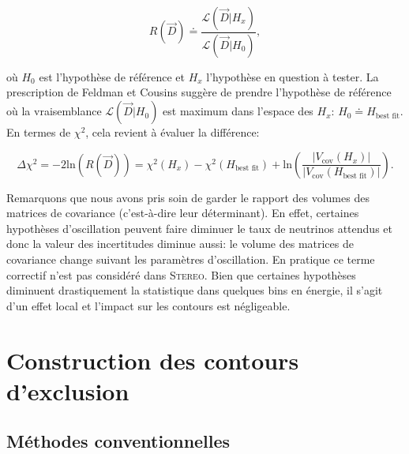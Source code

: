 \begin{equation}
    R(\overrightarrow{D} ) \doteq \frac{\mathcal{L}(\overrightarrow{D} | H_x)}{\mathcal{L}(\overrightarrow{D} | H_0)},
\end{equation}


\bigbreak

où $H_0$ est l'hypothèse de référence et $H_x$ l'hypothèse en question à tester. La prescription de Feldman et Cousins \cite{Feldman:1998wt} suggère de prendre l'hypothèse de référence où la vraisemblance $\mathcal{L}(\overrightarrow{D} | H_0)$ est maximum dans l'espace des $H_x$: $H_0 \doteq H_\textrm{best fit}$. En termes de $\chi^2$, cela revient à évaluer la différence:

\begin{equation}
    \Delta \chi^2 = -2\textrm{ln}\left(R(\overrightarrow{D})\right) = \chi^2(H_x) - \chi^2(H_\textrm{best fit}) + \textrm{ln}\left( \frac{\left| V_\textrm{cov}(H_x) \right|}{\left| V_\textrm{cov}(H_\textrm{best fit} ) \right|} \right).
\end{equation}

\bigbreak

Remarquons que nous avons pris soin de garder le rapport des volumes des matrices de covariance (c'est-à-dire leur déterminant). En effet, certaines hypothèses d'oscillation peuvent faire diminuer le taux de neutrinos attendus et donc la valeur des incertitudes diminue aussi: le volume des matrices de covariance change suivant les paramètres d'oscillation. En pratique ce terme correctif n'est pas considéré dans \textsc{Stereo}. Bien que certaines hypothèses diminuent drastiquement la statistique dans quelques bins en énergie, il s'agit d'un effet local et l'impact sur les contours est négligeable.\\


\bigbreak

\section{Construction des contours d'exclusion}
\label{sec:building_exclision_contours}


\subsection{Méthodes conventionnelles}

